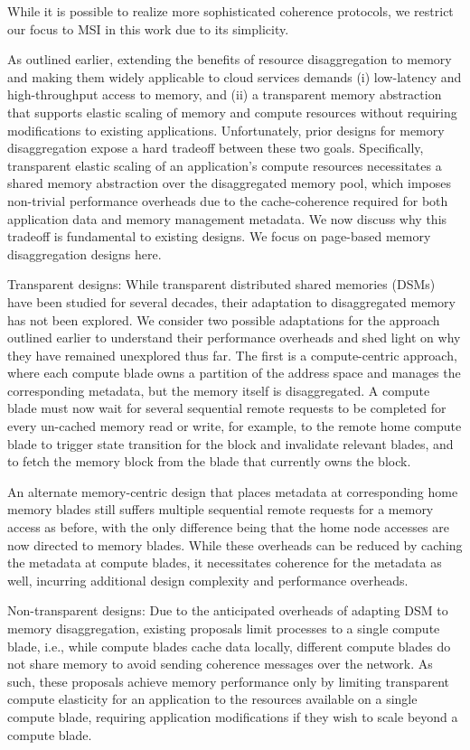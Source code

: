 While it is possible to realize more sophisticated coherence protocols, we restrict our focus to MSI in this work due to its simplicity.

As outlined earlier, extending the benefits of resource disaggregation to memory and making them widely applicable to cloud services demands (i) low-latency and high-throughput access to memory, and (ii) a transparent memory abstraction that supports elastic scaling of memory and compute resources without requiring modifications to existing applications. Unfortunately, prior designs for memory disaggregation expose a hard tradeoff between these two goals. Specifically, transparent elastic scaling of an application’s compute resources necessitates a shared memory abstraction over the disaggregated memory pool, which imposes non-trivial performance overheads due to the cache-coherence required for both application data and memory management metadata. We now discuss why this tradeoff is fundamental to existing designs. We focus on page-based memory disaggregation designs here.

Transparent designs: While transparent distributed shared memories (DSMs) have been studied for several decades, their adaptation to disaggregated memory has not been explored. We consider two possible adaptations for the approach outlined earlier to understand their performance overheads and shed light on why they have remained unexplored thus far. The first is a compute-centric approach, where each compute blade owns a partition of the address space and manages the corresponding metadata, but the memory itself is disaggregated. A compute blade must now wait for several sequential remote requests to be completed for every un-cached memory read or write, for example, to the remote home compute blade to trigger state transition for the block and invalidate relevant blades, and to fetch the memory block from the blade that currently owns the block.

An alternate memory-centric design that places metadata at corresponding home memory blades still suffers multiple sequential remote requests for a memory access as before, with the only difference being that the home node accesses are now directed to memory blades. While these overheads can be reduced by caching the metadata at compute blades, it necessitates coherence for the metadata as well, incurring additional design complexity and performance overheads.

Non-transparent designs: Due to the anticipated overheads of adapting DSM to memory disaggregation, existing proposals limit processes to a single compute blade, i.e., while compute blades cache data locally, different compute blades do not share memory to avoid sending coherence messages over the network. As such, these proposals achieve memory performance only by limiting transparent compute elasticity for an application to the resources available on a single compute blade, requiring application modifications if they wish to scale beyond a compute blade.

